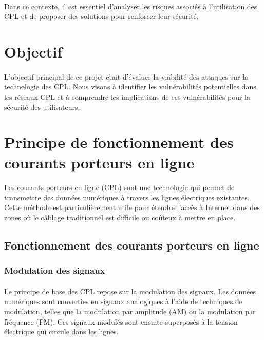 \documentclass[a4paper,twocolumn]{report}
\begin{document}
\paragraph{}Dans ce contexte, il est essentiel d'analyser les risques associés à l'utilisation des CPL et de proposer des solutions pour renforcer leur sécurité.

\section{Objectif}
\paragraph{} L'objectif principal de ce projet était d'évaluer la viabilité des
attaques sur la technologie des CPL. Nous visons à identifier les vulnérabilités
potentielles dans les réseaux CPL et à comprendre les implications de ces vulnérabilités
pour la sécurité des utilisateurs.

\section{Principe de fonctionnement des courants porteurs en ligne}
\paragraph{} Les courants porteurs en ligne (CPL) sont une technologie qui permet
de transmettre des données numériques à travers les lignes électriques existantes.
Cette méthode est particulièrement utile pour étendre l'accès à Internet dans
des zones où le câblage traditionnel est difficile ou coûteux à mettre en place.

\subsection{Fonctionnement des courants porteurs en ligne}

\subsubsection{Modulation des signaux}
\paragraph{} Le principe de base des CPL repose sur la modulation des signaux.
Les données numériques sont converties en signaux analogiques à l'aide de techniques
de modulation, telles que la modulation par amplitude (AM) ou la modulation par fréquence (FM).
Ces signaux modulés sont ensuite superposés à la tension électrique qui circule dans les lignes.
\end{document}

